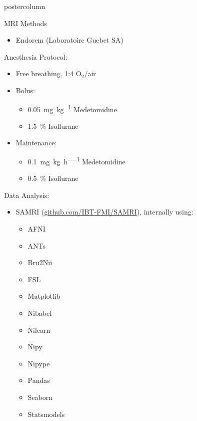 \documentclass{beamer}
\begin{document}
\begin{frame}
\begin{columns}
\begin{column}{.57\textwidth}
\begin{beamercolorbox}[center]{postercolumn}
\begin{minipage}{.98\textwidth}
{\begin{myblock}{MRI Methods}
\begin{center}
\begin{minipage}{.37\textwidth}
\begin{itemize}
\begin{itemize}
										\end{itemize}
									\item Endorem (Laboratoire Guebet SA)
								\end{itemize}
							\end{minipage}
							\begin{minipage}{.26\textwidth}
								Anesthesia Protocol:
								\begin{itemize}
									\item Free breathing, 1:4 O$_2$/air
									\item Bolus:
										\begin{itemize}
											\item \SI{0.05}{\mg\per\kg} Medetomidine
											\item \SI{1.5}{\percent} Isoflurane
										\end{itemize}
									\item Maintenance:
										\begin{itemize}
											\item \SI{0.1}{\mg\per\kg\per\hour} Medetomidine
											\item \SI{0.5}{\percent} Isoflurane
										\end{itemize}
								\end{itemize}
							\end{minipage}
							\begin{minipage}{.32\textwidth}
								Data Analysis:
								\begin{itemize}
									\item SAMRI (\href{https://github.com/IBT-FMI/SAMRI}{github.com/IBT-FMI/SAMRI}), internally using:
										\begin{multicols}{3}
											\begin{itemize}
												\item AFNI
												\item ANTs
												\item Bru2Nii
												\item FSL
												\item Matplotlib
												\item Nibabel
												\item Nilearn
												\item Nipy
												\item Nipype
												\item Pandas
												\item Seaborn
												\item Statsmodels

\end{itemize}
\end{multicols}
\end{itemize}
\end{minipage}
\end{center}
\end{myblock}}
\end{minipage}
\end{beamercolorbox}
\end{column}
\end{columns}
\end{frame}
\end{document}
